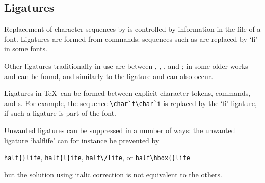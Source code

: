 \documentclass{book}
\begin{document}
\subsection{Ligatures}

Replacement of character sequences by  is controlled
by information in the  file of a font.
Ligatures are formed from  commands:
sequences such as  are replaced by `fi' in some fonts.

Other ligatures traditionally in use are
between , , , and ;
in some older works  and  can be found,
and similarly to the  ligature  and 
can also occur.

Ligatures in \TeX\ can be formed between explicit character
tokens,  commands, and s.
For example,
the sequence \verb-\char`f\char`i- is replaced by the
`fi' ligature, if such a ligature is part of the font.

Unwanted ligatures can be suppressed in a number of ways:
the unwanted ligature `\hbox{halflife}' can
for instance be prevented by
\begin{disp} \verb>half{}life>, \verb>half{l}ife>, \verb>half\/life>,
      or \verb>half\hbox{}life>\end{disp}
but the solution using italic correction is not equivalent
to the others.
\end{document}
